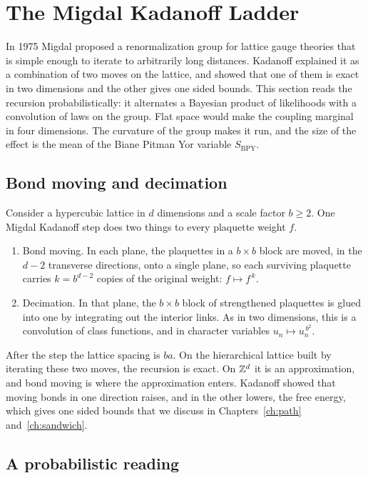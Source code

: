 \section{The Migdal Kadanoff Ladder}\label{ch:mk}

In 1975 Migdal\cite{Mi75} proposed a renormalization group for lattice gauge theories that is simple enough to iterate to arbitrarily long distances. Kadanoff\cite{Ka75,Ka76} explained it as a combination of two moves on the lattice, and showed that one of them is exact in two dimensions and the other gives one sided bounds. This section reads the recursion probabilistically: it alternates a Bayesian product of likelihoods with a convolution of laws on the group. Flat space would make the coupling marginal in four dimensions. The curvature of the group makes it run, and the size of the effect is the mean of the Biane Pitman Yor\cite{BPY} variable $S_{\mathrm{BPY}}$.

\subsection{Bond moving and decimation}

Consider a hypercubic lattice in $d$ dimensions and a scale factor $b\ge2$. One Migdal Kadanoff step does two things to every plaquette weight $f$.
\begin{enumerate}
\item[(i)] Bond moving. In each plane, the plaquettes in a $b\times b$ block are moved, in the $d-2$ transverse directions, onto a single plane, so each surviving plaquette carries $k=b^{d-2}$ copies of the original weight: $f\mapsto f^{\,k}$.
\item[(ii)] Decimation. In that plane, the $b\times b$ block of strengthened plaquettes is glued into one by integrating out the interior links. As in two dimensions, this is a convolution of class functions, and in character variables $u_n\mapsto u_n^{\,b^2}$.
\end{enumerate}
After the step the lattice spacing is $ba$. On the hierarchical lattice built by iterating these two moves, the recursion is exact. On $\mathbb{Z}^d$ it is an approximation, and bond moving is where the approximation enters. Kadanoff showed that moving bonds in one direction raises, and in the other lowers, the free energy, which gives one sided bounds that we discuss in Chapters~\ref{ch:path} and~\ref{ch:sandwich}.

\subsection{A probabilistic reading}

